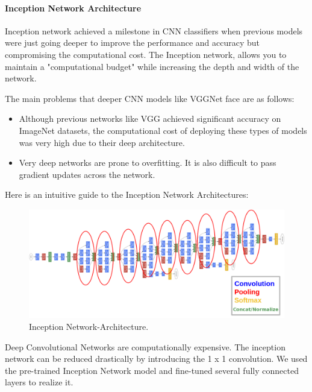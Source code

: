 \paragraph{Inception Network Architecture}

Inception network\cite{szegedy2015going} achieved a milestone in CNN classifiers when previous models were just going deeper to improve the performance and accuracy but compromising the computational cost. The Inception network, allows you to maintain a "computational budget" while increasing the depth and width of the network.

The main problems that deeper CNN models like VGGNet face are as follows:
\begin{itemize}
    \item Although previous networks like VGG achieved significant accuracy on ImageNet datasets, the computational cost of deploying these types of models was very high due to their deep architecture.
    \item Very deep networks are prone to overfitting. It is also difficult to pass gradient updates across the network.
\end{itemize}

Here is an intuitive guide to the Inception Network Architectures:

\begin{figure}[H]
    \centering\includegraphics[width=12cm]{./figures/inception.png}
    \caption{Inception Network-Architecture.}
    \label{pic:inception}
\end{figure}

Deep Convolutional Networks are computationally expensive. The inception network can be reduced drastically by introducing the 1 x 1 convolution. We used the pre-trained Inception Network model and fine-tuned several fully connected layers to realize it. 

